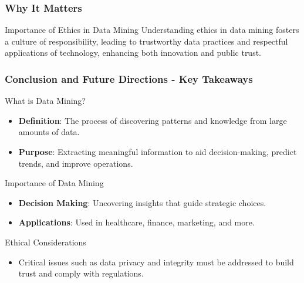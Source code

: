 \documentclass[aspectratio=169]{beamer}
\begin{document}
\begin{frame}[fragile]
    \frametitle{Why It Matters}
    \begin{block}{Importance of Ethics in Data Mining}
        Understanding ethics in data mining fosters a culture of responsibility, leading to trustworthy data practices and respectful applications of technology, enhancing both innovation and public trust.
    \end{block}
\end{frame}

\begin{frame}[fragile]
    \frametitle{Conclusion and Future Directions - Key Takeaways}
    
    \begin{block}{What is Data Mining?}
        \begin{itemize}
            \item \textbf{Definition}: The process of discovering patterns and knowledge from large amounts of data.
            \item \textbf{Purpose}: Extracting meaningful information to aid decision-making, predict trends, and improve operations.
        \end{itemize}
    \end{block}
    
    \begin{block}{Importance of Data Mining}
        \begin{itemize}
            \item \textbf{Decision Making}: Uncovering insights that guide strategic choices.
            \item \textbf{Applications}: Used in healthcare, finance, marketing, and more.
        \end{itemize}
    \end{block}
    
    \begin{block}{Ethical Considerations}
        \begin{itemize}
            \item Critical issues such as data privacy and integrity must be addressed to build trust and comply with regulations.
        \end{itemize}
    \end{block}
\end{frame}
\end{document}
